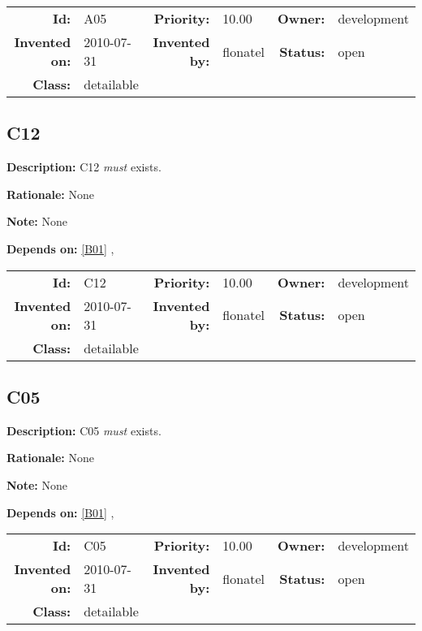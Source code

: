 \par
{\small \begin{center}\begin{tabular}{rlrlrl}
\textbf{Id:} & A05 & \textbf{Priority:} & 10.00 & \textbf{Owner:} & development \\ 
\textbf{Invented on:} & 2010-07-31 & \textbf{Invented by:} & flonatel & \textbf{Status:} & open \\ 
\textbf{Class:} & detailable & & & & \\ 
\end{tabular}\end{center} }%
\subsection{C12}\label{C12}
\textbf{Description:} C12 \textsl{must} exists.

\textbf{Rationale:} None

\textbf{Note:} None

\textbf{Depends on:} \ref{B01} , 

\par
{\small \begin{center}\begin{tabular}{rlrlrl}
\textbf{Id:} & C12 & \textbf{Priority:} & 10.00 & \textbf{Owner:} & development \\ 
\textbf{Invented on:} & 2010-07-31 & \textbf{Invented by:} & flonatel & \textbf{Status:} & open \\ 
\textbf{Class:} & detailable & & & & \\ 
\end{tabular}\end{center} }%
\subsection{C05}\label{C05}
\textbf{Description:} C05 \textsl{must} exists.

\textbf{Rationale:} None

\textbf{Note:} None

\textbf{Depends on:} \ref{B01} , 

\par
{\small \begin{center}\begin{tabular}{rlrlrl}
\textbf{Id:} & C05 & \textbf{Priority:} & 10.00 & \textbf{Owner:} & development \\ 
\textbf{Invented on:} & 2010-07-31 & \textbf{Invented by:} & flonatel & \textbf{Status:} & open \\ 
\textbf{Class:} & detailable & & & & \\ 
\end{tabular}\end{center} }%

